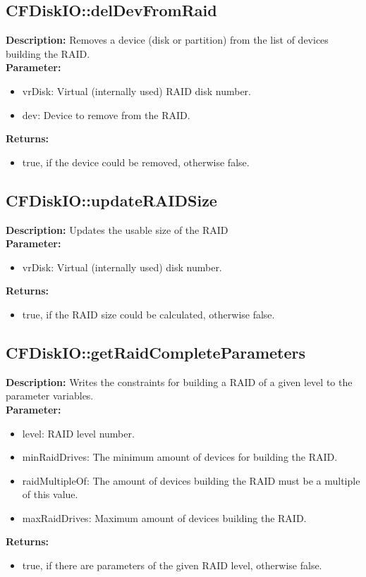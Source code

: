 \subsection{CFDiskIO::delDevFromRaid}
\textbf{Description:} Removes a device (disk or partition) from the list of devices building the RAID.\\
\textbf{Parameter:}
\begin{itemize}
\item vrDisk: Virtual (internally used) RAID disk number.
\item dev: Device to remove from the RAID.
\end{itemize}
\textbf{Returns:}
\begin{itemize}
\item true, if the device could be removed, otherwise false.
\end{itemize}

\subsection{CFDiskIO::updateRAIDSize}
\textbf{Description:} Updates the usable size of the RAID\\
\textbf{Parameter:}
\begin{itemize}
\item vrDisk: Virtual (internally used) disk number.
\end{itemize}
\textbf{Returns:}
\begin{itemize}
\item true, if the RAID size could be calculated, otherwise false.
\end{itemize}

\subsection{CFDiskIO::getRaidCompleteParameters}
\textbf{Description:} Writes the constraints for building a RAID of a given level to the parameter variables.\\
\textbf{Parameter:}
\begin{itemize}
\item level: RAID level number.
\item minRaidDrives: The minimum amount of devices for building the RAID.
\item raidMultipleOf: The amount of devices building the RAID must be a multiple of this value.
\item maxRaidDrives: Maximum amount of devices building the RAID.
\end{itemize}
\textbf{Returns:}
\begin{itemize}
\item true, if there are parameters of the given RAID level, otherwise false.
\end{itemize}


